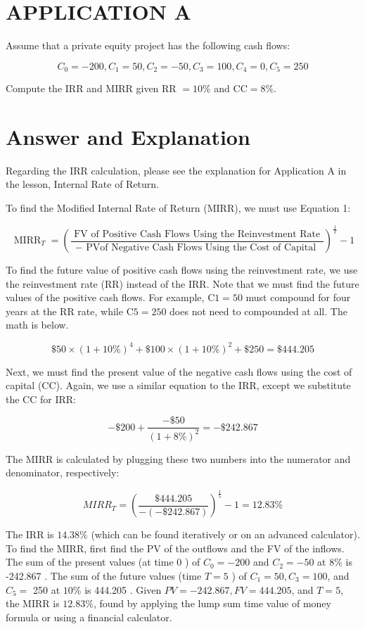 \documentclass[11pt]{article}
\begin{document}
\section*{APPLICATION A}
Assume that a private equity project has the following cash flows:

$$
C_{0}=-200, C_{1}=50, C_{2}=-50, C_{3}=100, C_{4}=0, C_{5}=250
$$

Compute the IRR and MIRR given RR $=10 \%$ and $\mathrm{CC}=8 \%$.

\section*{Answer and Explanation}
Regarding the IRR calculation, please see the explanation for Application A in the lesson, Internal Rate of Return.

To find the Modified Internal Rate of Return (MIRR), we must use Equation 1:

$$
\operatorname{MIRR}_{T}=\left(\frac{\text { FV of Positive Cash Flows Using the Reinvestment Rate }}{- \text { PVof Negative Cash Flows Using the Cost of Capital }}\right)^{\frac{1}{T}}-1
$$

To find the future value of positive cash flows using the reinvestment rate, we use the reinvestment rate (RR) instead of the IRR. Note that we must find the future values of the positive cash flows. For example, $\mathrm{C} 1=50$ must compound for four years at the RR rate, while $\mathrm{C} 5=250$ does not need to compounded at all. The math is below.

$$
\$ 50 \times(1+10 \%)^{4}+\$ 100 \times(1+10 \%)^{2}+\$ 250=\$ 444.205
$$

Next, we must find the present value of the negative cash flows using the cost of capital (CC). Again, we use a similar equation to the IRR, except we substitute the CC for IRR:

$$
-\$ 200+\frac{-\$ 50}{(1+8 \%)^{2}}=-\$ 242.867
$$

The MIRR is calculated by plugging these two numbers into the numerator and denominator, respectively:

$$
M I R R_{T}=\left(\frac{\$ 444.205}{-(-\$ 242.867)}\right)^{\frac{1}{5}}-1=12.83 \%
$$

The IRR is $14.38 \%$ (which can be found iteratively or on an advanced calculator). To find the MIRR, first find the PV of the outflows and the FV of the inflows. The sum of the present values (at time 0 ) of $C_{0}=-200$ and $C_{2}=-50$ at $8 \%$ is -242.867 . The sum of the future values (time $T=5$ ) of $C_{1}=50, C_{3}=100$, and $C_{5}=$ 250 at $10 \%$ is 444.205 . Given $P V=-242.867, F V=444.205$, and $T=5$, the MIRR is $12.83 \%$, found by applying the lump sum time value of money formula or using a financial calculator.
\end{document}

